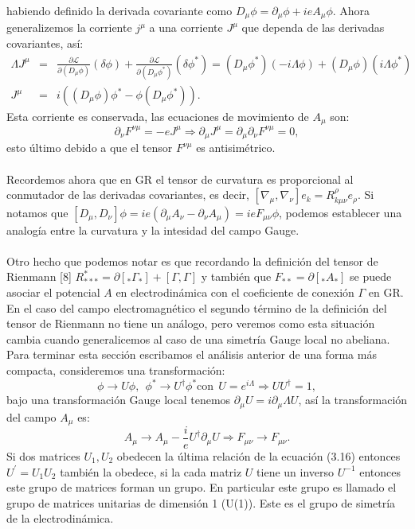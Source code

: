 habiendo definido la derivada covariante como $D_{\mu}\phi=\partial_{\mu}\phi+ieA_{\mu}\phi$. Ahora generalizemos la corriente $j^\mu$ a una corriente $J^\mu$ que dependa de las derivadas covariantes, así:\begin{eqnarray}
\nonumber \Lambda J^{\mu}&=&\frac{\partial\mathcal{L}}{\partial(D_{\mu}\phi)}(\delta\phi)+\frac{\partial\mathcal{L}}{\partial(D_{\mu}\phi^{*})}(\delta\phi^{*})=(D_{\mu}\phi^{*})(-i\Lambda\phi)+(D_{\mu}\phi)(i\Lambda\phi^{*})\\
J^\mu &=& i((D_{\mu}\phi)\phi^{*}-\phi(D_{\mu}\phi^{*})).
\end{eqnarray}
Esta corriente es conservada, las ecuaciones de movimiento de $A_\mu$ son:
\begin{equation}
\partial_{\nu}F^{\nu\mu}=-eJ^{\mu}\Rightarrow\partial_{\mu}J^{\mu}=\partial_{\mu}\partial_{\nu}F^{\nu\mu}=0,
\end{equation} 
esto último debido a que el tensor $F^{\nu\mu}$ es antisimétrico.
\\
\\
Recordemos ahora que en GR el tensor de curvatura es proporcional al conmutador de las derivadas covariantes, es decir, $[\nabla_{\mu},\nabla_{\nu}]e_{k}=R_{k\mu\nu}^{\rho}e_{\rho}$. Si notamos que $[D_{\mu},D_{\nu}]\phi=ie(\partial_{\mu}A_{\nu}-\partial_{\nu}A_{\mu})=ieF_{\mu\nu}\phi$, podemos establecer una analogía entre la curvatura y la intesidad del campo Gauge.
\\
\\
Otro hecho que podemos notar es que recordando la definición del tensor de Rienmann [8] $R_{***}^{*}=\partial[_{*}\Gamma_{*}]+[\Gamma,\Gamma] $ y también que $F_{**}=\partial[_{*}A_{*}]$ se puede asociar el potencial $A$ en electrodinámica con el coeficiente de conexión $\Gamma$ en GR. En el caso  del campo electromagnético el segundo término de la definición del tensor de Rienmann no tiene un análogo, pero veremos como esta situación cambia cuando generalicemos al caso de una simetría Gauge local no abeliana. Para terminar esta sección escribamos el análisis anterior de una forma más compacta, consideremos una transformación:
\begin{equation}
\phi\to U\phi,\ \ \phi^{*}\to U^{\dagger}\phi^{*}\text{con}\ \ U=e^{i\Lambda}\Rightarrow UU^{\dagger}=1,
\end{equation}
bajo una transformación Gauge local tenemos $\partial_\mu U=i\partial_\mu\Lambda U$, así la transformación del campo $A_\mu$ es:
\begin{equation}
A_{\mu}\to A_{\mu}-\frac{i}{e}U^{\dagger}\partial_{\mu}U\Rightarrow F_{\mu\nu}\to F_{\mu\nu}.
\end{equation}
Si dos matrices $U_1,U_2$ obedecen la última relación de la ecuación (3.16) entonces $U^{\prime}=U_1U_2$ también la obedece, si la cada matriz $U$ tiene un inverso $U^{-1}$ entonces este grupo de matrices forman un grupo. En particular este grupo es llamado el grupo de matrices unitarias de dimensión 1 (U(1)). Este es el grupo de simetría de la electrodinámica.



